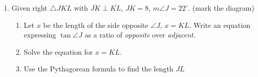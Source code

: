 \documentclass[12pt, twoside]{article}
\begin{document}
\begin{enumerate}
\item Given right $\triangle JKL$ with $\overline{JK} \perp \overline{KL}$, $JK=8$, $m\angle J=22^\circ$. (mark the diagram)
      \begin{enumerate}
        \item Let $x$ be the length of the side opposite $\angle J$, $x=KL$. Write an equation expressing $\tan \angle J$ as a ratio of \emph{opposite} over \emph{adjacent}.  
      \begin{flushright}
        \end{flushright}
        \item Solve the equation for $x=KL$. \vspace{3cm}
        \item Use the Pythagorean formula to find the length $JL$
      \end{enumerate}

\end{enumerate}
\end{document}
